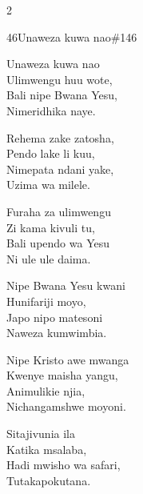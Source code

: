 \documentclass{article}
\begin{document}
\begin{multicols}{2}
\begin{hymn}{46}{Unaweza kuwa nao}{\#146}
\begin{stanza}
Unaweza kuwa nao\\
Ulimwengu huu wote,\\
Bali nipe Bwana Yesu,\\
Nimeridhika naye.
\end{stanza}
\begin{chorus}
Rehema zake zatosha,\\
Pendo lake li kuu,\\
Nimepata ndani yake,\\
Uzima wa milele.
\end{chorus}
\begin{stanza}
Furaha za ulimwengu\\
Zi kama kivuli tu,\\
Bali upendo wa Yesu\\
Ni ule ule daima.
\end{stanza}
\begin{stanza}
Nipe Bwana Yesu kwani\\
Hunifariji moyo,\\
Japo nipo matesoni\\
Naweza kumwimbia.
\end{stanza}
\begin{stanza}
Nipe Kristo awe mwanga\\
Kwenye maisha yangu,\\
Animulikie njia,\\
Nichangamshwe moyoni.
\end{stanza}
\begin{stanza}
Sitajivunia ila\\
Katika msalaba,\\
Hadi mwisho wa safari,\\
Tutakapokutana.
\end{stanza}
\end{hymn}


\end{multicols}
\end{document}

